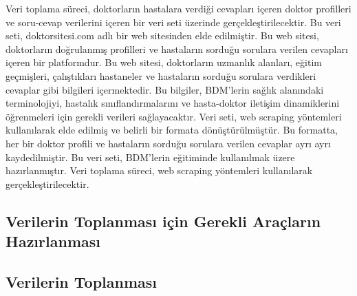 Veri toplama süreci, doktorların hastalara verdiği cevapları içeren doktor profilleri ve soru-cevap verilerini içeren bir veri seti üzerinde gerçekleştirilecektir. Bu veri seti, doktorsitesi.com adlı bir web sitesinden elde edilmiştir. Bu web sitesi, doktorların doğrulanmış profilleri ve hastaların sorduğu sorulara verilen cevapları içeren bir platformdur. Bu web sitesi, doktorların uzmanlık alanları, eğitim geçmişleri, çalıştıkları hastaneler ve hastaların sorduğu sorulara verdikleri cevaplar gibi bilgileri içermektedir. Bu bilgiler, BDM'lerin sağlık alanındaki terminolojiyi, hastalık sınıflandırmalarını ve hasta-doktor iletişim dinamiklerini öğrenmeleri için gerekli verileri sağlayacaktır. Veri seti, web scraping yöntemleri kullanılarak elde edilmiş ve belirli bir formata dönüştürülmüştür. Bu formatta, her bir doktor profili ve hastaların sorduğu sorulara verilen cevaplar ayrı ayrı kaydedilmiştir. Bu veri seti, BDM'lerin eğitiminde kullanılmak üzere hazırlanmıştır. Veri toplama süreci, web scraping yöntemleri kullanılarak gerçekleştirilecektir.
\subsection{Verilerin Toplanması için Gerekli Araçların Hazırlanması}


\subsection{Verilerin Toplanması}

